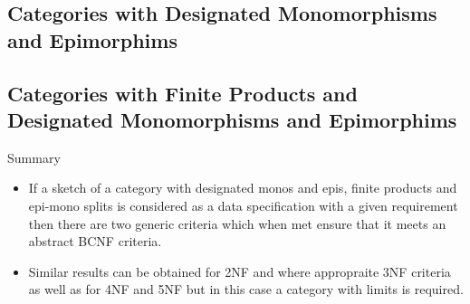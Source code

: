 \subsection{Categories with Designated Monomorphisms and Epimorphims}


\subsection{Categories with Finite Products and Designated Monomorphisms and Epimorphims}


\begin{frame}{Summary}
\begin{itemize}
\item If a sketch of a category with designated monos and epis, finite products and epi-mono splits is
 considered as a data specification with a given requirement then there are  two generic criteria which when met
 ensure that it meets an abstract BCNF criteria.
\item Similar results can be obtained for 2NF and where appropraite 3NF criteria as well as for 4NF and 5NF but in this case a category with limits is required.
\end{itemize}
\end{frame}



\iffalse

\subsection{Entity-Relationship Notation}


\subsection{Unused}

\fi

